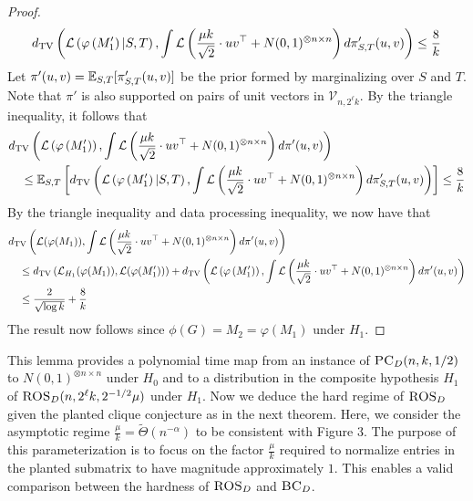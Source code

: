 \documentclass[11pt]{article}
\begin{document}
\begin{proof}
$$d_{\text{TV}}\left( \mathcal{L}\left( \varphi\left( M_1' \right) | S, T \right), \int \mathcal{L}\left( \frac{\mu k}{\sqrt{2}} \cdot uv^\top + N(0, 1)^{\otimes n \times n} \right) d\pi'_{S, T}(u, v)\right) \le \frac{8}{k}$$
Let $\pi'(u, v) = \mathbb{E}_{S, T}[\pi'_{S,T}(u, v)]$ be the prior formed by marginalizing over $S$ and $T$. Note that $\pi'$ is also supported on pairs of unit vectors in $\mathcal{V}_{n, 2^\ell k}$. By the triangle inequality, it follows that
\begin{align*}
&d_{\text{TV}}\left( \mathcal{L}\left( \varphi\left( M_1' \right) \right), \int \mathcal{L}\left( \frac{\mu k}{\sqrt{2}} \cdot uv^\top + N(0, 1)^{\otimes n \times n} \right) d\pi'(u, v) \right) \\
&\quad \le \mathbb{E}_{S, T} \left[ d_{\text{TV}}\left( \mathcal{L}\left( \varphi\left( M_1' \right) | S, T \right), \int \mathcal{L}\left( \frac{\mu k}{\sqrt{2}} \cdot uv^\top + N(0, 1)^{\otimes n \times n} \right) d\pi'_{S, T}(u, v)\right) \right] \le \frac{8}{k}
\end{align*}
By the triangle inequality and data processing inequality, we now have that
\begin{align*}
&d_{\text{TV}}\left( \mathcal{L}(\varphi(M_1)), \int \mathcal{L}\left( \frac{\mu k}{\sqrt{2}} \cdot  uv^\top + N(0, 1)^{\otimes n \times n} \right) d\pi'(u, v) \right) \\
&\quad \le d_{\text{TV}}\left( \mathcal{L}_{H_1}(\varphi(M_1)), \mathcal{L}(\varphi(M_1')) \right) + d_{\text{TV}}\left( \mathcal{L}\left( \varphi\left( M_1' \right) \right), \int \mathcal{L}\left( \frac{\mu k}{\sqrt{2}} \cdot uv^\top + N(0, 1)^{\otimes n \times n} \right) d\pi'(u, v) \right) \\
&\quad \le \frac{2}{\sqrt{\log k}} + \frac{8}{k}
\end{align*}
The result now follows since $\phi(G) = M_2 = \varphi(M_1)$ under $H_1$.
\end{proof}

This lemma provides a polynomial time map from an instance of $\textsc{PC}_D(n, k, 1/2)$ to $N(0, 1)^{\otimes n \times n}$ under $H_0$ and to a distribution in the composite hypothesis $H_1$ of $\textsc{ROS}_D(n, 2^\ell k, 2^{-1/2} \mu)$ under $H_1$. Now we deduce the hard regime of $\textsc{ROS}_D$ given the planted clique conjecture as in the next theorem. Here, we consider the asymptotic regime $\frac{\mu}{k} = \tilde{\Theta}(n^{-\alpha})$ to be consistent with Figure 3. The purpose of this parameterization is to focus on the factor $\frac{\mu}{k}$ required to normalize entries in the planted submatrix to have magnitude approximately $1$. This enables a valid comparison between the hardness of $\textsc{ROS}_D$ and $\textsc{BC}_D$.
\end{document}
